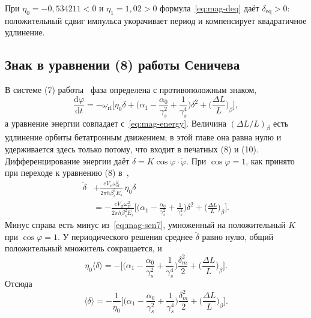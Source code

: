 \documentclass[aps,pra,preprint,a4paper,amsmath,amssymb,longbibliography]{revtex4-2}
\begin{document}
При $\eta_0=-0{,}534211<0$ и $\eta_1=1{,}02>0$ формула~\eqref{eq:mag-deq} даёт $\delta_{\mathrm{eq}}>0$: положительный сдвиг импульса укорачивает период и компенсирует квадратичное удлинение.

\subsection{Знак в уравнении (8) работы Сеничева}
\label{sec:sign}

В системе (7) работы~\cite{Senichev2013} фаза определена с противоположным знаком,
\begin{equation}
\label{eq:mag-sen7}
\frac{\mathrm{d}\varphi}{\mathrm{d}t}
=-\omega_{\mathrm{rf}}
\Biggl[
\eta_0\delta
+\Biggl(\alpha_1-\frac{\alpha_0}{\gamma_s^2}+\frac{1}{\gamma_s^4}\Biggr)\delta^2
+\Biggl(\frac{\Delta L}{L}\Biggr)_{\!\beta}
\Biggr],
\end{equation}
а уравнение энергии совпадает с~\eqref{eq:mag-energy}. Величина $(\Delta L/L)_\beta$ есть удлинение орбиты бетатронным движением; в этой главе она равна нулю и удерживается здесь только потому, что входит в печатных (8) и (10). Дифференцирование энергии даёт $\ddot\delta=K\cos\varphi\cdot\dot\varphi$. При $\cos\varphi=1$, как принято при переходе к уравнению (8) в~\cite{Senichev2013},
\begin{equation}
\label{eq:mag-sen8}
\begin{aligned}
\ddot\delta
&+\frac{eV_{\mathrm{rf}}\omega_{\mathrm{rf}}^2}{2\pi h\beta_s^2 E_s}\,\eta_0\delta
\\
&=
-\frac{eV_{\mathrm{rf}}\omega_{\mathrm{rf}}^2}{2\pi h\beta_s^2 E_s}
\Biggl[
\Biggl(\alpha_1-\frac{\alpha_0}{\gamma_s^2}+\frac{1}{\gamma_s^4}\Biggr)\delta^2
+\Biggl(\frac{\Delta L}{L}\Biggr)_{\!\beta}
\Biggr].
\end{aligned}
\end{equation}
Минус справа есть минус из~\eqref{eq:mag-sen7}, умноженный на положительный $K$ при $\cos\varphi=1$. У периодического решения среднее $\ddot\delta$ равно нулю, общий положительный множитель сокращается, и
\begin{equation}
\label{eq:mag-sen8-avg}
\eta_0\langle\delta\rangle
=
-\Biggl[
\Biggl(\alpha_1-\frac{\alpha_0}{\gamma_s^2}+\frac{1}{\gamma_s^4}\Biggr)
\frac{\delta_m^2}{2}
+\Biggl(\frac{\Delta L}{L}\Biggr)_{\!\beta}
\Biggr].
\end{equation}
Отсюда
\begin{equation}
\label{eq:mag-sen8-deq}
\langle\delta\rangle
=
-\frac{1}{\eta_0}
\Biggl[
\Biggl(\alpha_1-\frac{\alpha_0}{\gamma_s^2}+\frac{1}{\gamma_s^4}\Biggr)
\frac{\delta_m^2}{2}
+\Biggl(\frac{\Delta L}{L}\Biggr)_{\!\beta}
\Biggr].
\end{equation}
\end{document}
